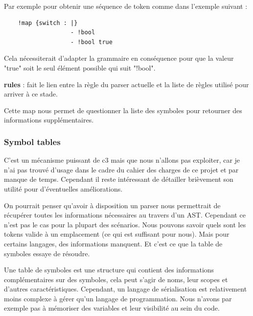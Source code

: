 \documentclass[
    iict, %
    il, %
]{heig-tb}
\begin{document}
Par exemple pour obtenir une séquence de token comme dans l'exemple suivant :

\begin{lstlisting}
    !map {switch : |}
                   - !bool
                   - !bool true
\end{lstlisting}

Cela nécessiterait d'adapter la grammaire en conséquence pour que la valeur "true" soit le seul élément possible qui suit "!bool".



\textbf{rules} : fait le lien entre la règle du parser actuelle et la liste de règles utilisé pour arriver à ce stade.

Cette map nous permet de questionner la liste des symboles pour retourner des informations supplémentaires.




\subsubsection{Symbol tables}

C'est un mécanisme puissant de c3 mais que nous n'allons pas exploiter,
car je n'ai pas trouvé d'usage dans le cadre du cahier des charges de ce projet et par manque de temps.
Cependant il reste intéressant de détailler brièvement son utilité pour d'éventuelles améliorations.

On pourrait penser qu'avoir à disposition un parser nous permettrait de récupérer toutes les informations nécessaires au travers d'un AST. %
Cependant ce n'est pas le cas pour la plupart des scénarios.
Nous pouvons savoir quels sont les tokens valide à un emplacement (ce qui est suffisant pour nous). Mais pour certains langages, des informations manquent.
Et c'est ce que la table de symboles essaye de résoudre.

Une table de symboles est une structure qui contient des informations complémentaires sur des symboles, cela peut s'agir de noms, leur scopes et d'autres caractéristiques.
Cependant, un langage de sérialisation est relativement moins complexe à gérer qu'un langage de programmation.
Nous n'avons par exemple pas à mémoriser des variables et leur visibilité au sein du code.
\end{document}
